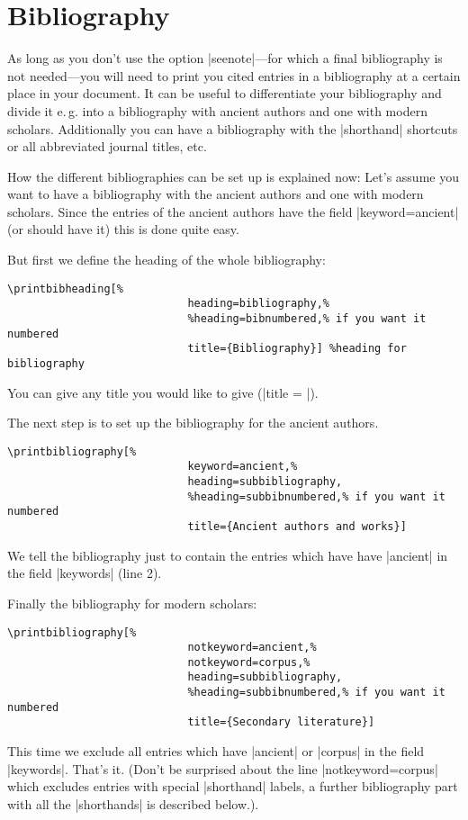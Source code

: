 \documentclass[a4paper,
10pt,
greek,
french,
spanish,
italian,
ngerman,
english
]{ltxdoc}
\begin{document}
	


\newpage
 \section{Bibliography}\label{bibliographie}
 \DescribeMacro{\printbibliography}
As long as you don’t use the option |seenote|---for 
which a final bibliography is not needed---you will need to print you cited entries in a bibliography 
at a certain place in your document.
It can be useful to differentiate your bibliography and divide it e.\,g. into a bibliography 
with ancient authors and one with modern scholars.
Additionally you can have a bibliography with the |shorthand| shortcuts or all abbreviated journal titles, etc.

How the different bibliographies can be set up is explained now:
Let’s assume you want to have a bibliography with the ancient authors and one with modern scholars.
Since the entries of the ancient authors have the field |keyword={ancient}| (or should have it) this is done quite easy.

But first we define the heading of the whole  bibliography:
\begin{lstlisting}
\printbibheading[%
							heading=bibliography,%
							%heading=bibnumbered,% if you want it numbered
							title={Bibliography}] %heading for bibliography
\end{lstlisting}
You can give any title you would like to give (|title = |).

The next step is to set up the bibliography for the ancient authors.

\begin{lstlisting}
\printbibliography[%
							keyword=ancient,%
							heading=subbibliography,
							%heading=subbibnumbered,% if you want it numbered
							title={Ancient authors and works}]
\end{lstlisting}
We tell the bibliography just to contain the entries which have have |ancient| in the field |keywords| (line 2).


Finally the bibliography for modern scholars:
\begin{lstlisting}
\printbibliography[%
							notkeyword=ancient,%
							notkeyword=corpus,%
							heading=subbibliography,
							%heading=subbibnumbered,% if you want it numbered
							title={Secondary literature}]
\end{lstlisting}
This time we exclude all entries which have |ancient| or |corpus| in the field |keywords|. 
That’s it.
(Don't be surprised about the line |notkeyword=corpus| which excludes entries with special |shorthand| labels, a further bibliography part with all the |shorthands| is described below.).
\end{document}
